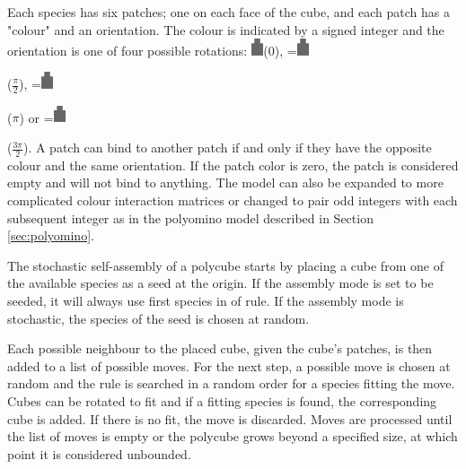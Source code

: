 Each species has six patches; one on each face of the cube, and each patch has a "colour" and an orientation. The colour is indicated by a signed integer and the orientation is one of four possible rotations: \includegraphics[width=10pt]{figures/face.eps}\hspace{4pt}(\(0\)),
\begingroup{}=\hbox{\includegraphics[width=10pt,angle=-90]{figures/face.eps}}\parbox{\wd0}{}\endgroup\hspace{4pt}(\(\frac{\pi}{2}\)),
\begingroup{}=\hbox{\includegraphics[width=10pt,angle=180]{figures/face.eps}}\parbox{\wd0}{}\endgroup\hspace{4pt}(\(\pi\)) or
\begingroup{}=\hbox{\includegraphics[width=10pt,angle=90]{figures/face.eps}}\parbox{\wd0}{}\endgroup\hspace{4pt}(\(\frac{3\pi}{2}\)). A patch can bind to another patch if and only if they have the opposite colour and the same orientation. If the patch color is zero, the patch is considered empty and will not bind to anything. The model can also be expanded to more complicated colour interaction matrices or changed to pair odd integers with each subsequent integer as in the polyomino model\cite{ahnert2010self}\cite{johnston2011evolutionary} described in Section \ref{sec:polyomino}.

The stochastic self-assembly of a polycube starts by placing a cube from one of the available species as a seed at the origin. If the assembly mode is set to be seeded, it will always use first species in of rule. If the assembly mode is stochastic, the species of the seed is chosen at random.

Each possible neighbour to the placed cube, given the cube's patches, is then added to a list of possible moves. For the next step, a possible move is chosen at random and the rule is searched in a random order for a species fitting the move. Cubes can be rotated to fit and if a fitting species is found, the corresponding cube is added. If there is no fit, the move is discarded. Moves are processed until the list of moves is empty or the polycube grows beyond a specified size, at which point it is considered unbounded.

